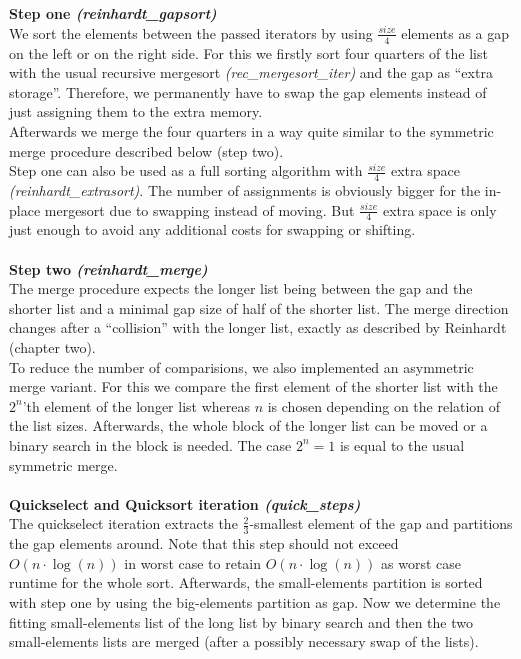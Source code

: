 \documentclass[11pt,pdftex,a4paper, twocolumn]{article}
\begin{document}
$ $ \\
$ $ \\
\textbf{Step one \textit{(reinhardt\_gapsort)}} \\
We sort the elements between the passed iterators by using $\frac{size}{4}$ elements as a gap on the left or on the right side. For this we firstly sort four quarters of the list with the usual recursive mergesort \textit{(rec\_mergesort\_iter)} and the gap as “extra storage”. Therefore, we permanently have to swap the gap elements instead of just assigning them to the extra memory. \\
Afterwards we merge the four quarters in a way quite similar to the symmetric merge procedure described below (step two). \\
Step one can also be used as a full sorting algorithm with $\frac{size}{4}$ extra space \textit{(reinhardt\_extrasort)}. The number of assignments is obviously bigger for the in-place mergesort due to swapping instead of moving. But $\frac{size}{4}$ extra space is only just enough to avoid any additional costs for swapping or shifting. \\
$ $ \\
\textbf{Step two \textit{(reinhardt\_merge)}} \\
The merge procedure expects the longer list being between the gap and the shorter list and a minimal gap size of half of the shorter list. The merge direction changes after a “collision” with the longer list, exactly as described by Reinhardt\cite{Reinhardt92} (chapter two). \\
To reduce the number of comparisions, we also implemented an asymmetric merge variant. For this we compare the first element of the shorter list with the $2^n$’th element of the longer list whereas $n$ is chosen depending on the relation of the list sizes. Afterwards, the whole block of the longer list can be moved or a binary search in the block is needed. The case $2^n = 1$ is equal to the usual symmetric merge. \\
$ $ \\
\textbf{Quickselect and Quicksort iteration \textit{(quick\_steps)}} \\
The quickselect iteration extracts the $\frac{2}{3}$-smallest element of the gap and partitions the gap elements around. Note that this step should not exceed $O(n \cdot \log(n))$ in worst case to retain $O(n \cdot \log(n))$ as worst case runtime for the whole sort. Afterwards, the small-elements partition is sorted with step one by using the big-elements partition as gap. Now we determine the fitting small-elements list of the long list by binary search and then the two small-elements lists are merged (after a possibly necessary swap of the lists). \\
\end{document}
